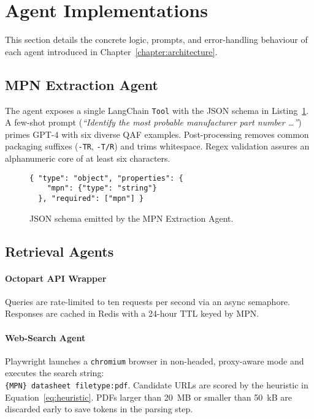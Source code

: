 \section{Agent Implementations}
This section details the concrete logic, prompts, and error-handling behaviour of each agent introduced in Chapter~\ref{chapter:architecture}.

\subsection{MPN Extraction Agent}
The agent exposes a single LangChain \texttt{Tool} with the JSON schema in Listing~\ref{lst:mpn_schema}.  A few-shot prompt (\emph{``Identify the most probable manufacturer part number …''}) primes GPT-4 with six diverse QAF examples.  Post-processing removes common packaging suffixes (\texttt{-TR}, \texttt{-T/R}) and trims whitespace.  Regex validation assures an alphanumeric core of at least six characters.
\begin{figure}[H]
\centering
\begin{minipage}{0.9\textwidth}
\begin{verbatim}
{ "type": "object", "properties": {
    "mpn": {"type": "string"}
  }, "required": ["mpn"] }
\end{verbatim}
\end{minipage}
\caption{JSON schema emitted by the MPN Extraction Agent.}
\label{lst:mpn_schema}
\end{figure}

\subsection{Retrieval Agents}
\paragraph{Octopart API Wrapper}  Queries are rate-limited to ten requests per second via an async semaphore.  Responses are cached in Redis with a 24-hour TTL keyed by MPN.

\paragraph{Web-Search Agent}  Playwright launches a \texttt{chromium} browser in non-headed, proxy-aware mode and executes the search string:\\
\texttt{\{MPN\} datasheet filetype:pdf}.  Candidate URLs are scored by the heuristic in Equation~\ref{eq:heuristic}.  PDFs larger than 20~MB or smaller than 50~kB are discarded early to save tokens in the parsing step.

